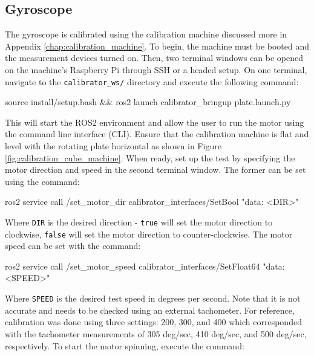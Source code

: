 \subsection{Gyroscope} 
The gyroscope is calibrated using the calibration machine discussed more in Appendix \ref{chap:calibration_machine}. 
To begin, the machine must be booted and the measurement devices turned on.
Then, two terminal windows can be opened on the machine's Raspberry Pi through SSH or a headed setup.
On one terminal, navigate to the \lstinline[style=customInline]|calibrator_ws/| directory and execute the following command:

\begin{bash}
    source install/setup.bash && ros2 launch calibrator_bringup plate.launch.py
\end{bash}

\noindent This will start the ROS2 environment and allow the user to run the motor using the command line interface (CLI).
Ensure that the calibration machine is flat and level with the rotating plate horizontal as shown in Figure \ref{fig:calibration_cube_machine}.
When ready, set up the test by specifying the motor direction and speed in the second terminal window.
The former can be set using the command:

\begin{bash}
    ros2 service call /set_motor_dir calibrator_interfaces/SetBool "{data: <DIR>}"
\end{bash}

\noindent Where \lstinline[style=customInline]|DIR| is the desired direction - \lstinline[style=customInline]|true| will set the motor direction to clockwise, \lstinline[style=customInline]|false| will set the motor direction to counter-clockwise.
The motor speed can be set with the command:

\begin{bash}
    ros2 service call /set_motor_speed calibrator_interfaces/SetFloat64 "{data: <SPEED>}"
\end{bash}

\noindent Where \lstinline[style=customInline]|SPEED| is the desired test speed in degrees per second.
Note that it is not accurate and needs to be checked using an external tachometer.
For reference, calibration was done using three settings: 200, 300, and 400 which corresponded with the tachometer measurements of 305 deg/sec, 410 deg/sec, and 500 deg/sec, respectively.
To start the motor spinning, execute the command:

